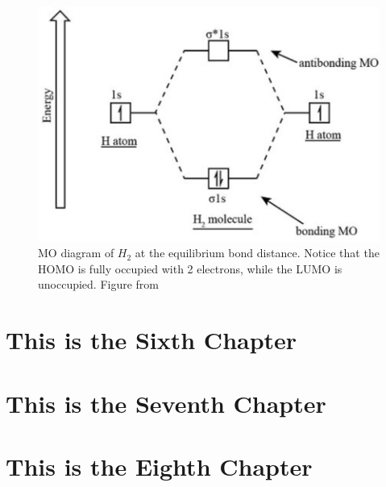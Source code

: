 \documentclass[12pt]{caltech_thesis}
\begin{document}
\begin{figure}[h]
    \centering
    \includegraphics[width=\textwidth]{h2_mo.png}
\caption{MO diagram of $H_2$ at the equilibrium bond distance. Notice that the HOMO is fully occupied with 2 electrons, while the LUMO is unoccupied. Figure from \textcite{bruneval_assessment_2019}}
\label{fig:h2_mo_diagram}
\end{figure}


\chapter{This is the Sixth Chapter}
\chapter{This is the Seventh Chapter}
\chapter{This is the Eighth Chapter}

\printbibliography[heading=bibintoc]

\appendix
\end{document}
